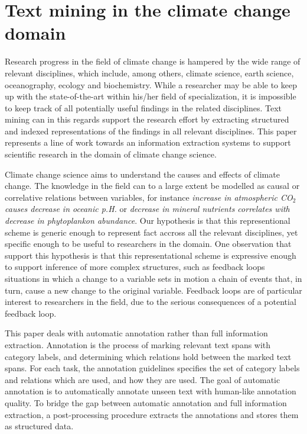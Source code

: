 \section{Text mining in the climate change domain}

Research progress in the field of climate change is hampered by the wide range of relevant disciplines, which include, among others, climate science, earth science, oceanography, ecology and biochemistry. While a researcher may be able to keep up with the state-of-the-art within his/her field of specialization, it is impossible to keep track of all potentially useful findings in the related disciplines. Text mining can in this regards support the research effort by extracting structured and indexed representations of the findings in all relevant disciplines. This paper represents a line of work towards an information extraction systems to support scientific research in the domain of climate change science.

Climate change science aims to understand the causes and effects of climate change. The knowledge in the field can to a large extent be modelled as causal or correlative relations between variables, for instance \emph{increase in atmospheric CO$_2$ causes decrease in oceanic p.H.} or \emph{decrease in mineral nutrients correlates with decrease in phytoplankon abundance}. Our hypothesis is that this representional scheme is generic enough to represent fact accross all the relevant disciplines, yet specific enough to be useful to researchers in the domain. One observation that support this hypothesis is that this representational scheme is expressive enough to support inference of more complex structures, such as feedback loops \textemdash situations in which a change to a variable sets in motion a chain of events that, in turn, cause a new change to the original variable. Feedback loops are of particular interest to researchers in the field, due to the serious consequences of a potential feedback loop. 

This paper deals with automatic annotation rather than full information extraction. Annotation is the process of marking relevant text spans with category labels, and determining which relations hold between the marked text spans. For each task, the annotation guidelines specifies the set of category labels and relations which are used, and how they are used. The goal of automatic annotation is to automatically annotate unseen text with human-like annotation quality. To bridge the gap between automatic annotation and full information extraction, a post-processing procedure extracts the annotations and stores them as structured data. 

